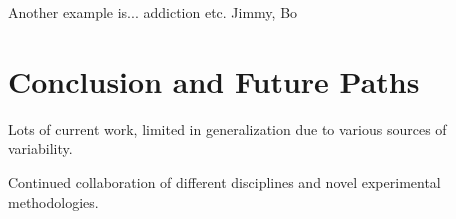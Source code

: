 \documentclass{article}
\begin{document}
Another example is... addiction etc. Jimmy, Bo

\section{Conclusion and Future Paths}
Lots of current work, limited in generalization due to various sources of variability.

Continued collaboration of different disciplines and novel experimental methodologies.
\vfill\pagebreak



\end{document}
